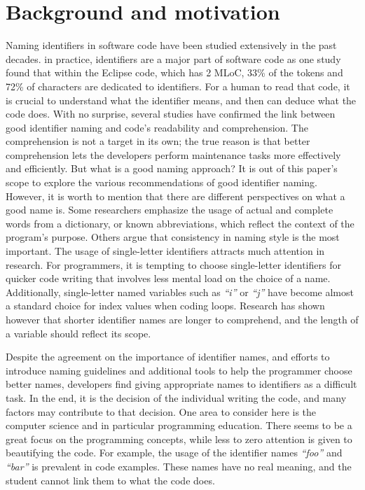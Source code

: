 \documentclass[conference]{IEEEtran}
\newcommand{\quotes}[1]{\textit{``#1''}}
\begin{document}
\section{Background and motivation}
Naming identifiers in software code have been studied extensively in the past decades. in practice, identifiers are a major part of software code as one study found that within the Eclipse code, which has 2 MLoC, 33\% of the tokens and 72\% of characters are dedicated to identifiers. For a human to read that code, it is crucial to understand what the identifier means, and then can deduce what the code does. With no surprise, several studies have confirmed the link between good identifier naming and code's readability and comprehension. The comprehension is not a target in its own; the true reason is that better comprehension lets the developers perform maintenance tasks more effectively and efficiently.
But what is a good naming approach? It is out of this paper's scope to explore the various recommendations of good identifier naming. However, it is worth to mention that there are different perspectives on what a good name is. Some researchers emphasize the usage of actual and complete words from a dictionary, or known abbreviations, which reflect the context of the program's purpose. Others argue that consistency in naming style is the most important. The usage of single-letter identifiers attracts much attention in research. For programmers, it is tempting to choose single-letter identifiers for quicker code writing that involves less mental load on the choice of a name. Additionally, single-letter named variables such as \quotes{i} or \quotes{j} have become almost a standard choice for index values when coding loops. Research has shown however that shorter identifier names are longer to comprehend, and the length of a variable should reflect its scope. 

Despite the agreement on the importance of identifier names, and efforts to introduce naming guidelines and additional tools to help the programmer choose better names, developers find giving appropriate names to identifiers as a difficult task. In the end, it is the decision of the individual writing the code, and many factors may contribute to that decision. One area to consider here is the computer science and in particular programming education. There seems to be a great focus on the programming concepts, while less to zero attention is given to beautifying the code. For example, the usage of the identifier names \quotes{foo} and \quotes{bar} is prevalent in code examples. These names have no real meaning, and the student cannot link them to what the code does.  
\end{document}
